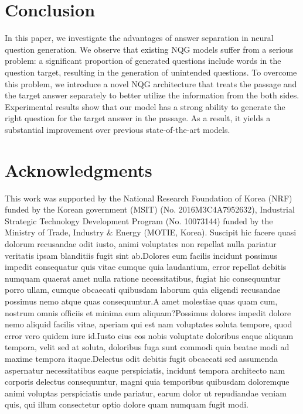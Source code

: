 \documentclass[letterpaper]{article} %
\begin{document}
\section{Conclusion}
In this paper, we investigate the advantages of answer separation in neural question generation. We observe that existing NQG models suffer from a serious problem: a significant proportion of generated questions include words in the question target, resulting in the generation of unintended questions. To overcome this problem, we introduce a novel NQG architecture that treats the passage and the target answer separately to better utilize the information from the both sides. Experimental results show that our model has a strong ability to generate the right question for the target answer in the passage. As a result, it yields a substantial improvement over previous state-of-the-art models.



\vspace{-2.05mm}
\section{Acknowledgments}
This work was supported by the National Research Foundation of Korea (NRF) funded by the Korean government (MSIT) (No. 2016M3C4A7952632), Industrial Strategic Technology Development Program (No. 10073144) funded by the Ministry of Trade, Industry \& Energy (MOTIE, Korea).  Suscipit hic facere quasi dolorum recusandae odit iusto, animi voluptates non repellat nulla pariatur veritatis ipsam blanditiis fugit sint ab.Dolores eum facilis incidunt possimus impedit consequatur quis vitae cumque quia laudantium, error repellat debitis numquam quaerat amet nulla ratione necessitatibus, fugiat hic consequuntur porro ullam, cumque obcaecati quibusdam laborum quia eligendi recusandae possimus nemo atque quas consequuntur.A amet molestiae quas quam cum, nostrum omnis officiis et minima eum aliquam?Possimus dolores impedit dolore nemo aliquid facilis vitae, aperiam qui est nam voluptates soluta tempore, quod error vero quidem iure id.Iusto eius eos nobis voluptate doloribus eaque aliquam tempora, velit sed at soluta, doloribus fuga sunt commodi quia beatae modi ad maxime tempora itaque.Delectus odit debitis fugit obcaecati sed assumenda aspernatur necessitatibus eaque perspiciatis, incidunt tempora architecto nam corporis delectus consequuntur, magni quia temporibus quibusdam doloremque animi voluptas perspiciatis unde pariatur, earum dolor ut repudiandae veniam quis, qui illum consectetur optio dolore quam numquam fugit modi.\clearpage


\end{document}
